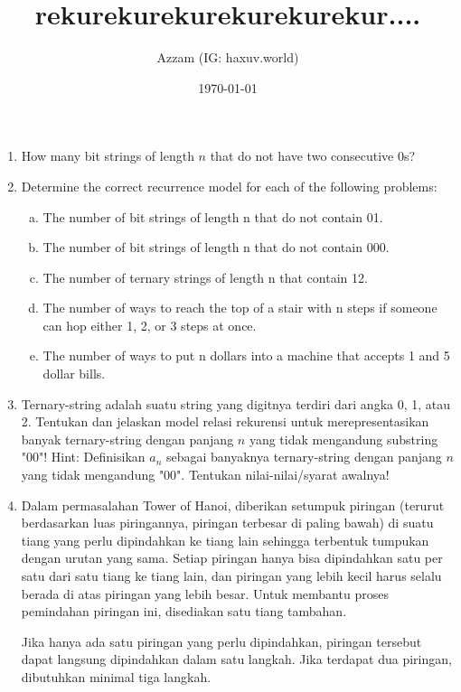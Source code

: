 \documentclass[11pt]{scrartcl}
\title{rekurekurekurekurekurekur....}
\author{Azzam (IG: haxuv.world)}
\date{\today}
\begin{document}
\maketitle
\begin{enumerate}
    \item How many bit strings of length $n$ that do not have two consecutive 0s?

    \item Determine the correct recurrence model for each of the following problems:
    \begin{enumerate}[a)]
        \item The number of bit strings of length n that do not contain 01.
        \item The number of bit strings of length n that do not contain 000.
        \item  The number of ternary strings of length n that contain 12.
        \item The number of ways to reach the top of a stair with n steps if someone can hop either 1, 2, or 3 steps at once.
        \item The number of ways to put n dollars into a machine that accepts 1 and 5 dollar bills.
    \end{enumerate}

    \item Ternary-string adalah suatu string yang digitnya terdiri dari angka 0, 1, atau 2.
    Tentukan dan jelaskan model relasi rekurensi untuk merepresentasikan banyak ternary-string dengan panjang $n$ yang tidak mengandung substring "00"! Hint: Definisikan $a_n$ sebagai banyaknya ternary-string dengan panjang $n$ yang tidak mengandung "00". Tentukan nilai-nilai/syarat awalnya!

    \item Dalam permasalahan Tower of Hanoi, diberikan setumpuk piringan (terurut berdasarkan luas piringannya, piringan terbesar di paling bawah) di suatu tiang yang perlu dipindahkan ke tiang lain sehingga terbentuk tumpukan dengan urutan yang sama. Setiap piringan hanya bisa dipindahkan satu per satu dari satu tiang ke tiang lain, dan piringan yang lebih kecil harus selalu berada di atas piringan yang lebih besar. Untuk membantu proses pemindahan piringan ini, disediakan satu tiang tambahan.
    
    Jika hanya ada satu piringan yang perlu dipindahkan, piringan tersebut dapat langsung dipindahkan dalam satu langkah. Jika terdapat dua piringan, dibutuhkan minimal tiga langkah.
    

\end{enumerate}
\end{document}

